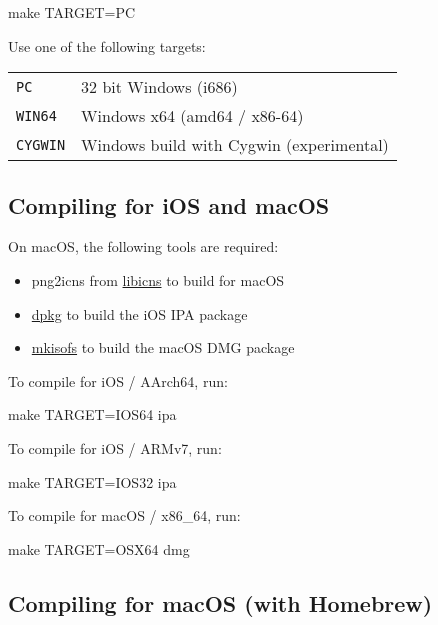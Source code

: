 \begin{verbatim*}
make TARGET=PC
\end{verbatim*}

Use one of the following targets:

\begin{tabularx}{1.9\textwidth}{lX}

\texttt{PC} & 32 bit Windows (i686) \\

\texttt{WIN64} & Windows x64 (amd64 / x86-64) \\

\texttt{CYGWIN} & Windows build with Cygwin (experimental) \\

\end{tabularx}

\subsection{Compiling for iOS and macOS}

On macOS, the following tools are required:
\begin{itemize}
\item png2icns from \href{http://icns.sourceforge.net}{libicns} to build for
  macOS
\item \href{https://alioth.debian.org/projects/dpkg}{dpkg} to build the iOS
  IPA package
\item \href{http://cdrecord.org/private/cdrecord.html}{mkisofs} to build the
  macOS DMG package
\end{itemize}

To compile for iOS / AArch64, run:

\begin{verbatim*}
make TARGET=IOS64 ipa
\end{verbatim*}

To compile for iOS / ARMv7, run:

\begin{verbatim*}
make TARGET=IOS32 ipa
\end{verbatim*}

To compile for macOS / x86\_64, run:

\begin{verbatim*}
make TARGET=OSX64 dmg
\end{verbatim*}

\subsection{Compiling for macOS (with Homebrew)}

